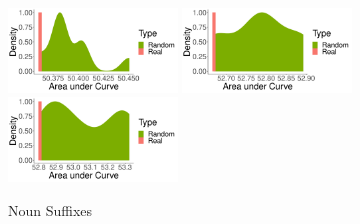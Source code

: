 \documentclass[11pt,letterpaper]{article}
\begin{document}
\begin{figure}
    \centering
    \includegraphics[width=0.4\textwidth]{figures/finnish_nouns/suffixes-byMorphemes-auc-hist-heldout-Coarse-FineSurprisal-optimized.pdf}
    \includegraphics[width=0.4\textwidth]{figures/turkish_nouns/suffixes-byMorphemes-auc-hist-heldout-Coarse-FineSurprisal-optimized.pdf}
    \includegraphics[width=0.4\textwidth]{figures/hungarian_nouns/suffixes-byMorphemes-auc-hist-heldout-Coarse-FineSurprisal-optimized.pdf}
    \caption{Noun Suffixes}
    \label{fig:my-label}
\end{figure}
\end{document}
